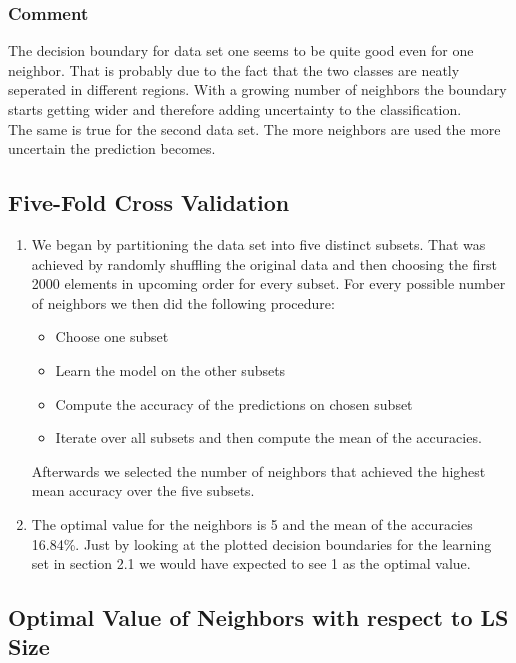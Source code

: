 \documentclass{article}
\begin{document}
\subsubsection{Comment}
The decision boundary for data set one seems to be quite good even for one neighbor. That is probably due to the fact that the two classes are neatly seperated in different regions. With a growing number of neighbors the boundary starts getting wider and therefore adding uncertainty to the classification. \\
The same is true for the second data set. The more neighbors are used the more uncertain the prediction becomes.

\subsection{Five-Fold Cross Validation}

\begin{enumerate}
	\item We began by partitioning the data set into five distinct subsets. That was achieved by randomly shuffling the original data and then choosing the first 2000 elements in upcoming order for every subset. For every possible number of neighbors we then did the following procedure:
	\begin{itemize}
		\item Choose one subset
		\item Learn the model on the other subsets
		\item Compute the accuracy of the predictions on chosen subset
		\item Iterate over all subsets and then compute the mean of the accuracies.
	\end{itemize}
	Afterwards we selected the number of neighbors that achieved the highest mean accuracy over the five subsets.
	\item
	The optimal value for the neighbors is 5 and the mean of the accuracies 16.84\%. Just by looking at the plotted decision boundaries for the learning set in section 2.1 we would have expected to see 1 as the optimal value.
\end{enumerate}

\subsection{Optimal Value of Neighbors with respect to LS Size}
\end{document}
